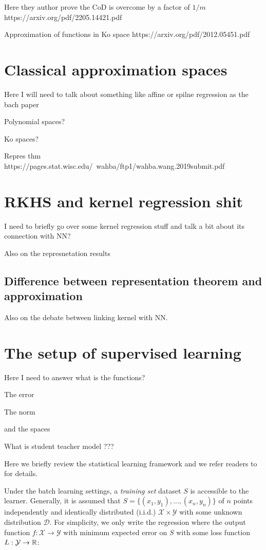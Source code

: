 Here they author prove the CoD is overcome by a factor of $1/m$
https://arxiv.org/pdf/2205.14421.pdf

Approximation of functions in Ko space https://arxiv.org/pdf/2012.05451.pdf

\section{Classical approximation spaces}

Here I will need to talk about something like affine or spilne regression as the
bach paper

Polynomial spaces?

Ko spaces?

Repres thm https://pages.stat.wisc.edu/~wahba/ftp1/wahba.wang.2019submit.pdf

\section{RKHS and kernel regression shit}

I need to briefly go over some kernel regression stuff and talk a bit about its
connection with NN?

Also on the represnetation results

\subsection{Difference between representation theorem and approximation}

Also on the debate between linking kernel with NN.


\section{The setup of supervised learning}

Here I need to answer what is the functions?

The error

The norm

and the spaces

What is student teacher model ???

Here we briefly review the statistical learning framework and we refer readers to \cite{shalev-shwartzUnderstandingMachineLearning2014a} for details.

Under the batch learning settings, a \textit{training set} dataset $S$ is
accessible to the learner. Generally, it is assumed that $S = \{(x_1,y_1),
\dots, (x_n, y_n)\}$ of $n$ points independently and identically distributed
(i.i.d.) $\mathcal{X} \times \mathcal{Y}$ with some unknown distribution
$\mathcal{D}$. For simplicity, we only write the regression where the output
function $f: \mathcal{X} \to \mathcal{Y}$ with minimum expected error on $S$
with some loss function $L: \mathcal{Y} \to \mathbb{R}$:

